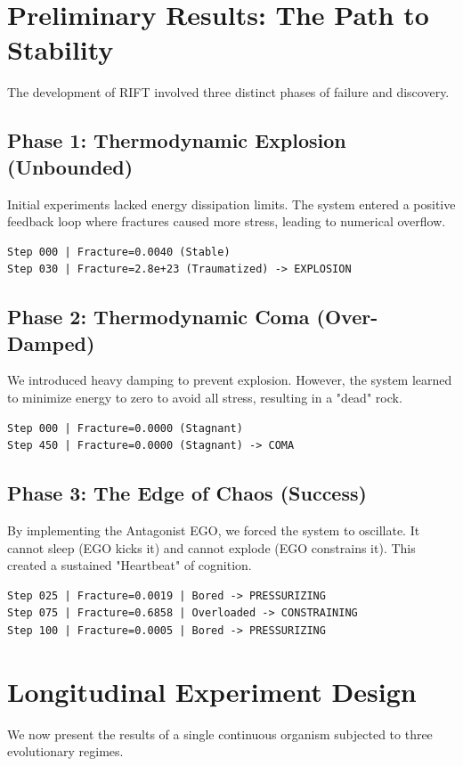 \documentclass[11pt, a4paper]{article}
\begin{document}
\section{Preliminary Results: The Path to Stability}
The development of RIFT involved three distinct phases of failure and discovery.

\subsection{Phase 1: Thermodynamic Explosion (Unbounded)}
Initial experiments lacked energy dissipation limits. The system entered a positive feedback loop where fractures caused more stress, leading to numerical overflow.
\begin{lstlisting}
Step 000 | Fracture=0.0040 (Stable)
Step 030 | Fracture=2.8e+23 (Traumatized) -> EXPLOSION
\end{lstlisting}

\subsection{Phase 2: Thermodynamic Coma (Over-Damped)}
We introduced heavy damping to prevent explosion. However, the system learned to minimize energy to zero to avoid all stress, resulting in a "dead" rock.
\begin{lstlisting}
Step 000 | Fracture=0.0000 (Stagnant)
Step 450 | Fracture=0.0000 (Stagnant) -> COMA
\end{lstlisting}

\subsection{Phase 3: The Edge of Chaos (Success)}
By implementing the Antagonist EGO, we forced the system to oscillate. It cannot sleep (EGO kicks it) and cannot explode (EGO constrains it). This created a sustained "Heartbeat" of cognition.
\begin{lstlisting}
Step 025 | Fracture=0.0019 | Bored -> PRESSURIZING
Step 075 | Fracture=0.6858 | Overloaded -> CONSTRAINING
Step 100 | Fracture=0.0005 | Bored -> PRESSURIZING
\end{lstlisting}

\section{Longitudinal Experiment Design}
We now present the results of a single continuous organism subjected to three evolutionary regimes.
\end{document}
